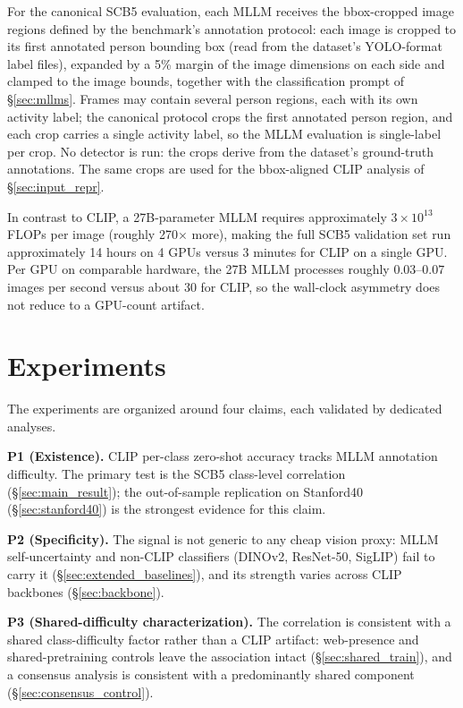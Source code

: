 \documentclass[a4paper,fleqn]{cas-sc}
\begin{document}
For the canonical SCB5 evaluation, each MLLM receives the bbox-cropped image regions defined by the benchmark's annotation protocol: each image is cropped to its first annotated person bounding box (read from the dataset's YOLO-format label files), expanded by a 5\% margin of the image dimensions on each side and clamped to the image bounds, together with the classification prompt of \S\ref{sec:mllms}. Frames may contain several person regions, each with its own activity label; the canonical protocol crops the first annotated person region, and each crop carries a single activity label, so the MLLM evaluation is single-label per crop. No detector is run: the crops derive from the dataset's ground-truth annotations. The same crops are used for the bbox-aligned CLIP analysis of \S\ref{sec:input_repr}.

In contrast to CLIP, a 27B-parameter MLLM requires approximately $3 \times 10^{13}$ FLOPs per image (roughly 270$\times$ more), making the full SCB5 validation set run approximately 14 hours on 4 GPUs versus 3 minutes for CLIP on a single GPU. Per GPU on comparable hardware, the 27B MLLM processes roughly $0.03$--$0.07$ images per second versus about 30 for CLIP, so the wall-clock asymmetry does not reduce to a GPU-count artifact.


\section{Experiments}
\label{sec:experiments}

The experiments are organized around four claims, each validated by dedicated analyses.

\textbf{P1 (Existence).} CLIP per-class zero-shot accuracy tracks MLLM annotation difficulty. The primary test is the SCB5 class-level correlation (\S\ref{sec:main_result}); the out-of-sample replication on Stanford40 (\S\ref{sec:stanford40}) is the strongest evidence for this claim.

\textbf{P2 (Specificity).} The signal is not generic to any cheap vision proxy: MLLM self-uncertainty and non-CLIP classifiers (DINOv2, ResNet-50, SigLIP) fail to carry it (\S\ref{sec:extended_baselines}), and its strength varies across CLIP backbones (\S\ref{sec:backbone}).

\textbf{P3 (Shared-difficulty characterization).} The correlation is consistent with a shared class-difficulty factor rather than a CLIP artifact: web-presence and shared-pretraining controls leave the association intact (\S\ref{sec:shared_train}), and a consensus analysis is consistent with a predominantly shared component (\S\ref{sec:consensus_control}).
\end{document}
